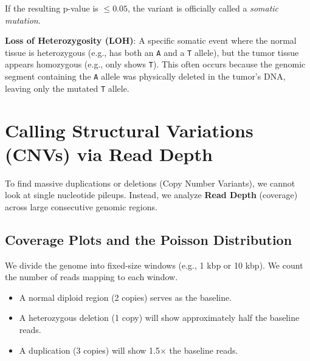 If the resulting p-value is $\le 0.05$, the variant is officially called a \textit{somatic mutation}.

\begin{important}
  \textbf{Loss of Heterozygosity (LOH)}: A specific somatic event where the normal tissue is heterozygous (e.g., has both an \texttt{A} and a \texttt{T} allele), but the tumor tissue appears homozygous (e.g., only shows \texttt{T}). This often occurs because the genomic segment containing the \texttt{A} allele was physically deleted in the tumor's DNA, leaving only the mutated \texttt{T} allele.
\end{important}

\section{Calling Structural Variations (CNVs) via Read Depth}

To find massive duplications or deletions (Copy Number Variants), we cannot look at single nucleotide pileups. Instead, we analyze \textbf{Read Depth} (coverage) across large consecutive genomic regions.


\subsection{Coverage Plots and the Poisson Distribution}
We divide the genome into fixed-size windows (e.g., 1 kbp or 10 kbp). We count the number of reads mapping to each window.
\begin{itemize}
    \item A normal diploid region (2 copies) serves as the baseline.
    \item A heterozygous deletion (1 copy) will show approximately half the baseline reads.
    \item A duplication (3 copies) will show 1.5$\times$ the baseline reads.
\end{itemize}

